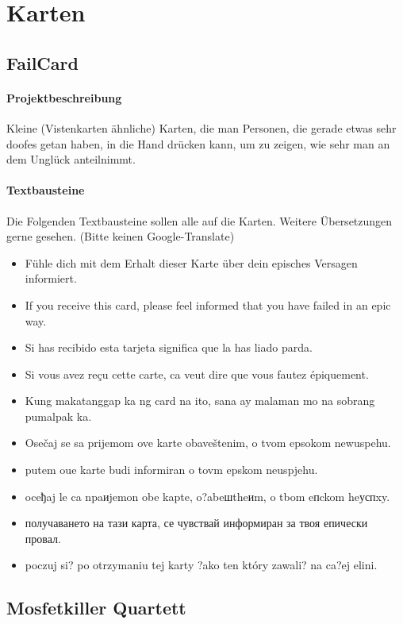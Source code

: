 \section{Karten}
\subsection{FailCard}
\paragraph{Projektbeschreibung} Kleine (Vistenkarten ähnliche) Karten, die man Personen, die gerade etwas sehr doofes getan haben, in die Hand drücken kann, um zu zeigen, wie sehr man an dem Unglück anteilnimmt.
\paragraph{Textbausteine}
Die Folgenden Textbausteine sollen alle auf die Karten. Weitere Übersetzungen gerne gesehen. (Bitte keinen Google-Translate)
\begin{itemize}
	\item Fühle dich mit dem Erhalt dieser Karte über dein episches Versagen informiert.
	\item If you receive this card, please feel informed that you have failed in an epic way.
	\item Si has recibido esta tarjeta significa que la has liado parda.
	\item Si vous avez reçu cette carte, ca veut dire que vous fautez épiquement.
	\item Kung makatanggap ka ng card na ito, sana ay malaman mo na sobrang pumalpak ka.
	\item Osečaj se sa prijemom ove karte obaveštenim, o tvom epsokom newuspehu.
	\item putem oue karte budi informiran o tovm epskom neuspjehu.
	\item \foreignlanguage{russian}{oceђaj le ca npaиjemon obe kapte, o?abeшtheиm, o tbom eпckom heуспxy.}
	\item \foreignlanguage{russian}{получаването на тази карта, се чувствай информиран за твоя епически провал.}
	\item \foreignlanguage{russian}{poczuj si? po otrzymaniu tej karty ?ako ten który zawali? na ca?ej elini.}
\end{itemize}

\subsection{Mosfetkiller Quartett}

